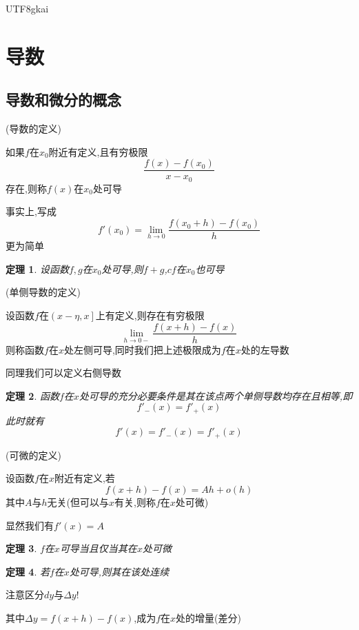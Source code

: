 \documentclass{article}
\newtheorem{theorem}{定理}[subsection]
\newenvironment{identification}{%
\heiti{定义}\kaishu
}{%
}
\begin{document}
\begin{CJK}{UTF8}{gkai}
\section{导数}
\subsection{导数和微分的概念}
\begin{identification}
(导数的定义)

如果$f$在$x_0$附近有定义,且有穷极限
\[\dfrac{f(x) - f(x_0)}{ x - x_0}\]
存在,则称$f(x)$在$x_0$处可导

事实上,写成
\[f'(x_0) = \lim_{h\to 0} \dfrac{f(x_0 + h) - f(x_0)}{h}\]
更为简单
\end{identification}

\begin{theorem}
  设函数$f,g$在$x_0$处可导,则$f + g$,$cf$在$x_0$也可导
\end{theorem}

\begin{identification}
(单侧导数的定义)

设函数$f$在$\left(x - \eta,x \right]$上有定义,则存在有穷极限
\[\lim_{h\to 0-}\dfrac{f(x + h) - f(x)}{h}\]
则称函数$f$在$x$处左侧可导,同时我们把上述极限成为$f$在$x$处的左导数

同理我们可以定义右侧导数
\end{identification}

\begin{theorem}
  函数$f$在$x$处可导的充分必要条件是其在该点两个单侧导数均存在且相等,即
  \[f'_-(x) = f'_+(x)\]
  此时就有
  \[f'(x) = f'_-(x) = f'_+(x)\]
\end{theorem}

\begin{identification}
(可微的定义)

设函数$f$在$x$附近有定义,若
\[f(x + h) - f(x) = Ah + o(h)\]
其中$A$与$h$无关(但可以与$x$有关,则称$f$在$x$处可微)
\end{identification}

显然我们有$f'(x) = A$

\begin{theorem}
  $f$在$x$可导当且仅当其在$x$处可微
\end{theorem}

\begin{theorem}
  若$f$在$x$处可导,则其在该处连续
\end{theorem}

注意区分$dy$与$\Delta y$!

其中$\Delta y = f(x + h) - f(x)$,成为$f$在$x$处的增量(差分)


\end{CJK}
\end{document}
